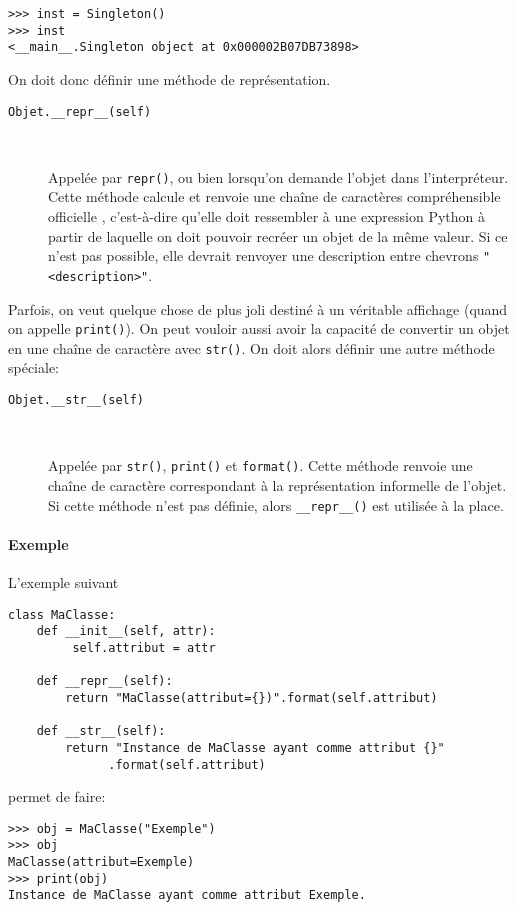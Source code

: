 \begin{verbatim}
>>> inst = Singleton()
>>> inst
<__main__.Singleton object at 0x000002B07DB73898>
\end{verbatim}

On doit donc définir une méthode de représentation.

\begin{description}
    \item[\texttt{Objet.__repr__(self)}]~

    Appelée par \texttt{repr()}, ou bien lorsqu'on demande l'objet dans l'interpréteur. Cette méthode calcule et renvoie une chaîne de caractères compréhensible \og officielle \fg{}, c'est-à-dire qu'elle doit ressembler à une expression Python à partir de laquelle on doit pouvoir recréer un objet de la même valeur. Si ce n'est pas possible, elle devrait renvoyer une description entre chevrons \texttt{"<description>"}. 
\end{description}

Parfois, on veut quelque chose de plus joli destiné à un véritable affichage (quand on appelle \texttt{print()}). On peut vouloir aussi avoir la capacité de convertir un objet en une chaîne de caractère avec \texttt{str()}. On doit alors définir une autre méthode spéciale:

\begin{description}
    \item[\texttt{Objet.__str__(self)}]~

    Appelée par \texttt{str()}, \texttt{print()} et \texttt{format()}. Cette méthode renvoie une chaîne de caractère correspondant à la représentation informelle de l'objet. Si cette méthode n'est pas définie, alors \texttt{__repr__()} est utilisée à la place.
\end{description}
\paragraph{Exemple} L'exemple suivant
\begin{verbatim}
class MaClasse:
    def __init__(self, attr):
         self.attribut = attr

    def __repr__(self):
        return "MaClasse(attribut={})".format(self.attribut)

    def __str__(self):
        return "Instance de MaClasse ayant comme attribut {}"
              .format(self.attribut)
\end{verbatim}
permet de faire:
\begin{verbatim}
>>> obj = MaClasse("Exemple")
>>> obj
MaClasse(attribut=Exemple)
>>> print(obj)
Instance de MaClasse ayant comme attribut Exemple.
\end{verbatim}

